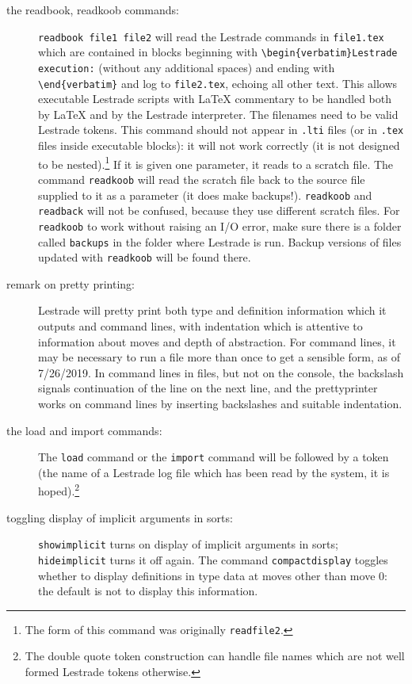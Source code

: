 \documentclass[12pt]{article}
\begin{document}
\begin{description}
\item[the readbook, readkoob commands:]  {\tt readbook file1 file2}  will read the Lestrade commands in {\tt file1.tex} which are contained in blocks beginning with {\verb$\begin{verbatim}Lestrade execution:$} (without any additional spaces) and ending with {\verb$\end{verbatim}$} and log to {\tt file2.tex}, echoing all other text.  This allows executable Lestrade scripts with LaTeX commentary to be handled both by LaTeX and by the Lestrade interpreter.  The filenames need to be valid Lestrade tokens.  This command should not appear in {\tt .lti} files (or in {\tt .tex} files inside executable blocks):  it will not work correctly (it is not designed to be nested).\footnote{The form of this command was originally {\tt readfile2}.}  If it is given one parameter, it reads to a scratch file.  The command {\tt readkoob} will read the scratch file back to the source file supplied to it as a parameter (it does make backups!).  {\tt readkoob} and {\tt readback} will not be confused, because they use different scratch files.   For {\tt readkoob} to work without raising an I/O error, make sure there is a folder called {\tt backups} in the folder where Lestrade is run.  Backup versions of files updated with {\tt readkoob} will be found there.


\item[remark on pretty printing:]  Lestrade will pretty print both type and definition information which it outputs
and command lines, with indentation which is attentive to information about moves and depth of abstraction.  For command lines, it may be necessary to run a file more than once to get a sensible form, as of 7/26/2019.  In command lines in files, but not on the console, the backslash signals continuation of the line on the next line, and the prettyprinter works on command lines by inserting backslashes and suitable indentation.

\item[the load and import commands:]  The {\tt load} command or the {\tt import} command will be followed by a token (the name of a Lestrade log file which has been read by the system, it is hoped).\footnote{The double quote token construction can handle file names which are not well formed Lestrade tokens otherwise.}

\item[toggling display of implicit arguments in sorts:]  {\tt showimplicit} turns on display of implicit arguments in sorts; {\tt hideimplicit} turns it off again.  The command {\tt compactdisplay} toggles whether to display definitions in type data
at moves other than move 0:  the default is not to display this information.


\end{description}
\end{document}

